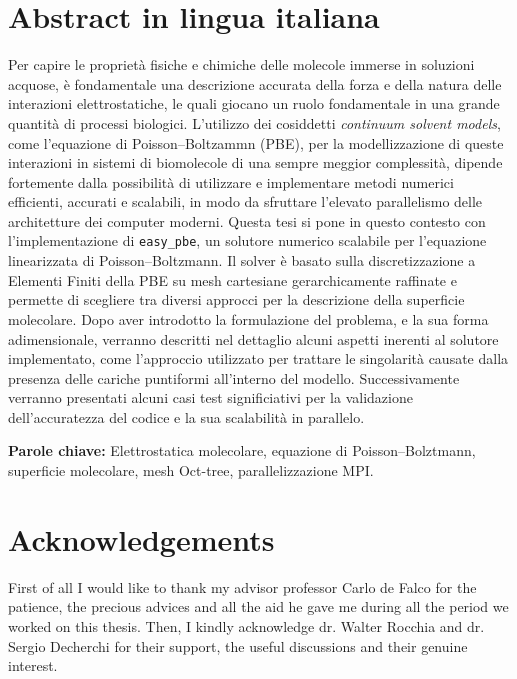 \documentclass[11pt,a4paper]{article}
\begin{document}
\section*{Abstract in lingua italiana}
Per capire le proprietà fisiche e chimiche delle molecole immerse in soluzioni acquose, è fondamentale una descrizione accurata della forza e della natura delle interazioni elettrostatiche, le quali giocano un ruolo fondamentale in una grande quantità di processi biologici.  
L'utilizzo dei cosiddetti \emph{continuum solvent models}, come l'equazione di Poisson--Boltzammn (PBE), per la modellizzazione di queste interazioni in sistemi di biomolecole di una sempre meggior complessità, dipende fortemente dalla possibilità di utilizzare e implementare metodi numerici efficienti, accurati e scalabili, in modo da sfruttare l'elevato parallelismo delle architetture dei computer moderni. 
Questa tesi si pone in questo contesto con l'implementazione di {\tt easy\_pbe}, un solutore numerico scalabile per l'equazione linearizzata di Poisson--Boltzmann. Il solver è basato sulla discretizzazione a Elementi Finiti della PBE su mesh cartesiane gerarchicamente raffinate e permette di scegliere tra diversi approcci per la descrizione della superficie molecolare. Dopo aver introdotto la formulazione del problema, e la sua forma adimensionale, verranno descritti nel dettaglio alcuni aspetti inerenti al solutore implementato, come l'approccio utilizzato per trattare le singolarità causate dalla presenza delle cariche puntiformi all'interno del modello. Successivamente verranno presentati alcuni casi test significiativi per la validazione dell'accuratezza del codice e la sua scalabilità in parallelo.   

\vspace{15pt}
\begin{tcolorbox}[arc=0pt, boxrule=0pt, colback=bluePoli!60, width=\textwidth, colupper=white]
    \textbf{Parole chiave:} Elettrostatica molecolare, equazione di Poisson--Bolztmann, superficie molecolare, mesh Oct-tree, parallelizzazione MPI.
\end{tcolorbox}

\section*{Acknowledgements}
First of all I would like to thank my advisor professor Carlo de Falco for the patience, the precious advices and all the aid he gave me during all the period we worked on this thesis. Then, I kindly acknowledge dr. Walter Rocchia and dr. Sergio Decherchi for their support, the useful discussions and their genuine interest. \\
\end{document}
